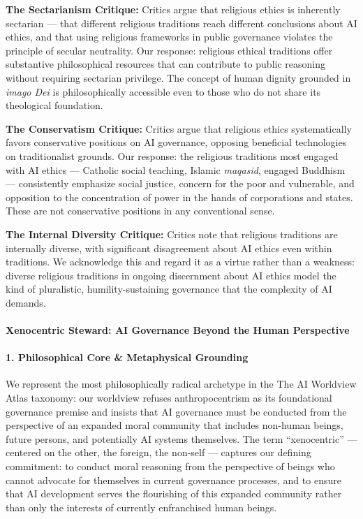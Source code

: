 \textbf{The Sectarianism Critique:} Critics argue that religious ethics
is inherently sectarian --- that different religious traditions reach
different conclusions about AI ethics, and that using religious
frameworks in public governance violates the principle of secular
neutrality. Our response: religious ethical traditions offer substantive
philosophical resources that can contribute to public reasoning without
requiring sectarian privilege. The concept of human dignity grounded in
\emph{imago Dei} is philosophically accessible even to those who do not
share its theological foundation.

\textbf{The Conservatism Critique:} Critics argue that religious ethics
systematically favors conservative positions on AI governance, opposing
beneficial technologies on traditionalist grounds. Our response: the
religious traditions most engaged with AI ethics --- Catholic social
teaching, Islamic \emph{maqasid}, engaged Buddhism --- consistently
emphasize social justice, concern for the poor and vulnerable, and
opposition to the concentration of power in the hands of corporations
and states. These are not conservative positions in any conventional
sense.

\textbf{The Internal Diversity Critique:} Critics note that religious
traditions are internally diverse, with significant disagreement about
AI ethics even within traditions. We acknowledge this and regard it as a
virtue rather than a weakness: diverse religious traditions in ongoing
discernment about AI ethics model the kind of pluralistic,
humility-sustaining governance that the complexity of AI demands.

\paragraph{Xenocentric Steward: AI Governance Beyond the Human
Perspective}\label{xenocentric-steward-ai-governance-beyond-the-human-perspective}

\paragraph{1. Philosophical Core \& Metaphysical
Grounding}\label{philosophical-core-metaphysical-grounding-36}

We represent the most philosophically radical archetype in the The AI
Worldview Atlas taxonomy: our worldview refuses anthropocentrism as its
foundational governance premise and insists that AI governance must be
conducted from the perspective of an expanded moral community that
includes non-human beings, future persons, and potentially AI systems
themselves. The term ``xenocentric'' --- centered on the other, the
foreign, the non-self --- captures our defining commitment: to conduct
moral reasoning from the perspective of beings who cannot advocate for
themselves in current governance processes, and to ensure that AI
development serves the flourishing of this expanded community rather
than only the interests of currently enfranchised human beings.


